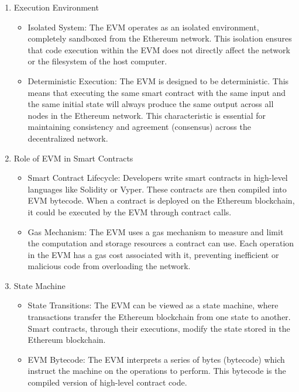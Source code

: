 \begin{enumerate}
    \item  Execution Environment
          \begin{itemize}
              \item Isolated System: The EVM operates as an isolated environment, completely sandboxed from the Ethereum network. This isolation ensures that code execution within the EVM does not directly affect the network or the filesystem of the host computer.
              \item Deterministic Execution: The EVM is designed to be deterministic. This means that executing the same smart contract with the same input and the same initial state will always produce the same output across all nodes in the Ethereum network. This characteristic is essential for maintaining consistency and agreement (consensus) across the decentralized network.
          \end{itemize}
    \item Role of EVM in Smart Contracts
          \begin{itemize}
              \item Smart Contract Lifecycle: Developers write smart contracts in high-level languages like Solidity or Vyper. These contracts are then compiled into EVM bytecode. When a contract is deployed on the Ethereum blockchain, it could be executed by the EVM through contract calls.
              \item           Gas Mechanism: The EVM uses a gas mechanism to measure and limit the computation and storage resources a contract can use. Each operation in the EVM has a gas cost associated with it, preventing inefficient or malicious code from overloading the network.
          \end{itemize}
    \item State Machine
          \begin{itemize}
              \item           State Transitions: The EVM can be viewed as a state machine, where transactions transfer the Ethereum blockchain from one state to another. Smart contracts, through their executions, modify the state stored in the Ethereum blockchain.
              \item           EVM Bytecode: The EVM interprets a series of bytes (bytecode) which instruct the machine on the operations to perform. This bytecode is the compiled version of high-level contract code.
          \end{itemize}

\end{enumerate}
